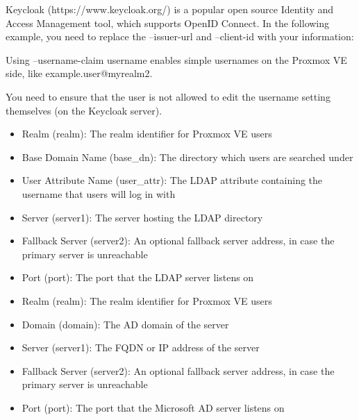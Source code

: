 Keycloak (https://www.keycloak.org/) is a popular open source Identity and Access Management tool, which supports OpenID Connect. In the following example, you need to replace the --issuer-url and --client-id with your information:

Using --username-claim username enables simple usernames on the Proxmox VE side, like example.user@myrealm2.

You need to ensure that the user is not allowed to edit the username setting themselves (on the Keycloak server).

\begin{itemize}[leftmargin=2cm]

	\item Realm (realm): The realm identifier for Proxmox VE users

	\item Base Domain Name (base_dn): The directory which users are searched under

	\item User Attribute Name (user_attr): The LDAP attribute containing the username that users will log in with

	\item Server (server1): The server hosting the LDAP directory

	\item Fallback Server (server2): An optional fallback server address, in case the primary server is unreachable

	\item Port (port): The port that the LDAP server listens on

\end{itemize}

\begin{itemize}[leftmargin=2cm]

	\item Realm (realm): The realm identifier for Proxmox VE users

	\item Domain (domain): The AD domain of the server

	\item Server (server1): The FQDN or IP address of the server

	\item Fallback Server (server2): An optional fallback server address, in case the primary server is unreachable

	\item Port (port): The port that the Microsoft AD server listens on

\end{itemize}

